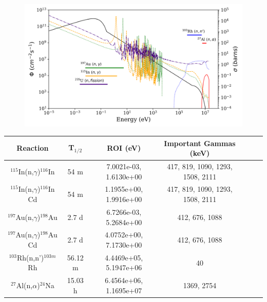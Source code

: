 \documentclass[a4paper, 11pt]{article}
\begin{document}
\begin{figure}[!ht]
   \centering
   \includegraphics[width=1.0\textwidth]{plot/amalgamated}
   \label{fig:amalgamated}
\end{figure}



\begin{table}[h]
\centering
\begin{tabular}{ |c|c|c|c|c|c|c| }
 \hline
 Reaction & T$_{1/2}$ & ROI (eV) & Important Gammas (keV) \\
 \hline
 $^{115}$In(n,$\gamma$)$^{116}$In & 54 m & 7.0021e-03, 1.6130e+00 & 417, 819, 1090, 1293, 1508, 2111 \\
 \hline
  $^{115}$In(n,$\gamma$)$^{116}$In Cd & 54 m & 1.1955e+00, 1.9916e+00 & 417, 819, 1090, 1293, 1508, 2111 \\
 \hline
 $^{197}$Au(n,$\gamma$)$^{198}$Au & 2.7 d & 6.7266e-03, 5.2684e+00 & 412, 676, 1088 \\
 \hline
 $^{197}$Au(n,$\gamma$)$^{198}$Au Cd & 2.7 d & 4.0752e+00, 7.1730e+00 & 412, 676, 1088 \\
 \hline
 $^{103}$Rh(n,n')$^{103m}$Rh & 56.12 m & 4.4469e+05, 5.1947e+06 & 40 \\
 \hline
 $^{27}$Al(n,$\alpha$)$^{24}$Na & 15.03 h & 6.4564e+06, 1.1695e+07 & 1369, 2754 \\
 \hline
\end{tabular}
\end{table}

\newpage








\newpage
\end{document}
